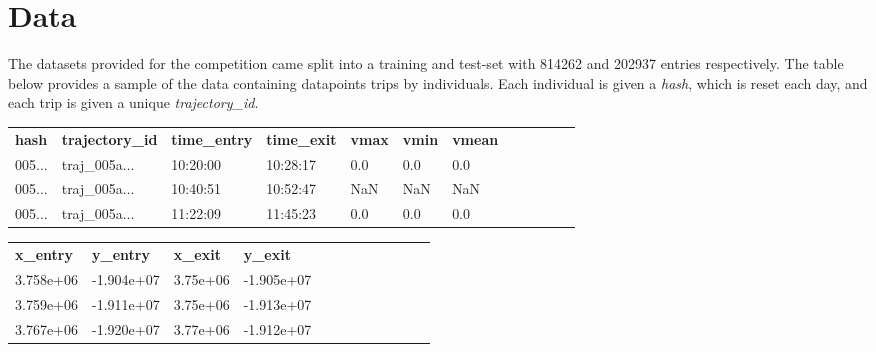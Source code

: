 \documentclass[12pt]{report}
\begin{document}
\section{Data}
The datasets provided for the competition came split into a training and test-set with 814262 and 202937 entries respectively. The table below provides a sample of the data containing datapoints trips by individuals.  Each individual is given a \textit{hash}, which is reset each day, and each trip is given a unique \textit{trajectory\_id}.  \\

\begin{center}
\begin{tabular}{ llllllllllll}
\textbf{hash} & \textbf{trajectory\_id}                      & \textbf{time\_entry}                                  & \textbf{time\_exit} & \textbf{vmax}     & \textbf{vmin} & \textbf{vmean}  \\
005... & traj\_005a... & 10:20:00   & 10:28:17 & 0.0  & 0.0   & 0.0 \\
005... & traj\_005a... & 10:40:51   & 10:52:47 & NaN  & NaN   & NaN \\
005... & traj\_005a... & 11:22:09   & 11:45:23 & 0.0  & 0.0   & 0.0
\end{tabular}
\end{center}

\begin{center}
\begin{tabular}{llllllllllll}
    \textbf{x\_entry} & \textbf{y\_entry}     & \textbf{x\_exit}       & \textbf{y\_exit}\\
      3.758e+06 & -1.904e+07 & 3.75e+06 & -1.905e+07\\
      3.759e+06 & -1.911e+07 & 3.75e+06 & -1.913e+07\\
      3.767e+06 & -1.920e+07 & 3.77e+06 & -1.912e+07\\
\end{tabular}
\end{center}
\end{document}
